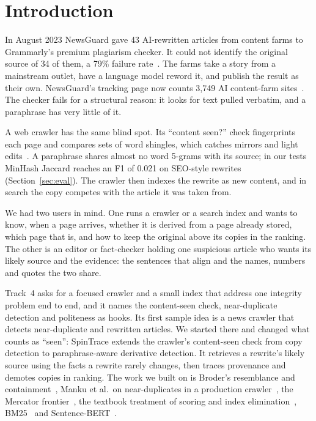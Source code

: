 \documentclass[11pt,a4paper]{article}
\begin{document}
\section{Introduction}
In August 2023 NewsGuard gave 43 AI-rewritten articles from content farms to Grammarly's premium plagiarism checker. It could not identify the original source of 34 of them, a 79\% failure rate~\cite{ng2023}. The farms take a story from a mainstream outlet, have a language model reword it, and publish the result as their own. NewsGuard's tracking page now counts 3,749 AI content-farm sites~\cite{ng2026}. The checker fails for a structural reason: it looks for text pulled verbatim, and a paraphrase has very little of it.

A web crawler has the same blind spot. Its ``content seen?'' check fingerprints each page and compares sets of word shingles, which catches mirrors and light edits~\cite{broder1997,manku2007,iir2008}. A paraphrase shares almost no word 5-grams with its source; in our tests MinHash Jaccard reaches an F1 of 0.021 on SEO-style rewrites (Section~\ref{sec:eval}). The crawler then indexes the rewrite as new content, and in search the copy competes with the article it was taken from.

We had two users in mind. One runs a crawler or a search index and wants to know, when a page arrives, whether it is derived from a page already stored, which page that is, and how to keep the original above its copies in the ranking. The other is an editor or fact-checker holding one suspicious article who wants its likely source and the evidence: the sentences that align and the names, numbers and quotes the two share.

Track~4 asks for a focused crawler and a small index that address one integrity problem end to end, and it names the content-seen check, near-duplicate detection and politeness as hooks. Its first sample idea is a news crawler that detects near-duplicate and rewritten articles. We started there and changed what counts as ``seen'': SpinTrace extends the crawler's content-seen check from copy detection to paraphrase-aware derivative detection. It retrieves a rewrite's likely source using the facts a rewrite rarely changes, then traces provenance and demotes copies in ranking. The work we built on is Broder's resemblance and containment~\cite{broder1997}, Manku et al.\ on near-duplicates in a production crawler~\cite{manku2007}, the Mercator frontier~\cite{heydon1999}, the textbook treatment of scoring and index elimination~\cite{iir2008}, BM25~\cite{robertson2009} and Sentence-BERT~\cite{reimers2019}.
\end{document}
